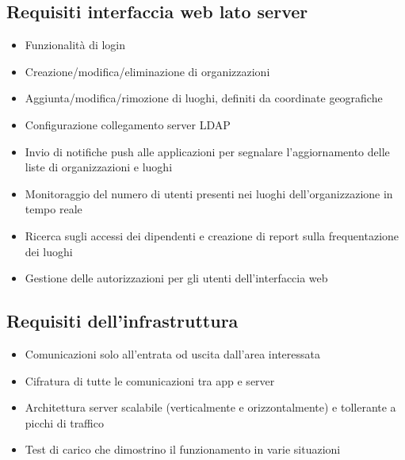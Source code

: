 \subsection{Requisiti interfaccia web lato server}
\begin{itemize}
	\item Funzionalità di login
	\item Creazione/modifica/eliminazione di organizzazioni
	\item Aggiunta/modifica/rimozione di luoghi, definiti da coordinate geografiche
	\item Configurazione collegamento server LDAP
	\item Invio di notifiche push alle applicazioni per segnalare l'aggiornamento delle liste di organizzazioni e luoghi
	\item Monitoraggio del numero di utenti presenti nei luoghi dell'organizzazione in tempo reale
	\item Ricerca sugli accessi dei dipendenti e creazione di report sulla frequentazione dei luoghi
	\item Gestione delle autorizzazioni per gli utenti dell'interfaccia web
\end{itemize}

\subsection{Requisiti dell'infrastruttura}
\begin{itemize}
	\item Comunicazioni solo all'entrata od uscita dall'area interessata
	\item Cifratura di tutte le comunicazioni tra app e server
	\item Architettura server scalabile (verticalmente e orizzontalmente) e tollerante a picchi di traffico
	\item Test di carico che dimostrino il funzionamento in varie situazioni
\end{itemize}

